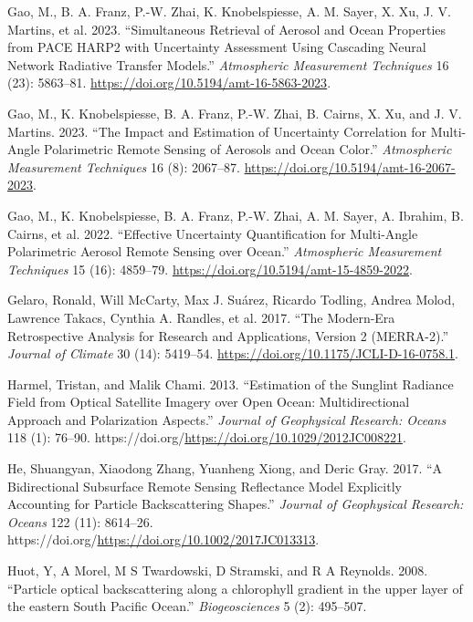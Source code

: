 \documentclass[
  letterpaper,
  open=any]{scrbook}
\newlength{\cslhangindent}
\newenvironment{CSLReferences}[2] %
 {\begin{list}{}{%
  \setlength{\itemindent}{0pt}
  \setlength{\leftmargin}{0pt}
  \setlength{\parsep}{0pt}
  \ifodd #1
   \setlength{\leftmargin}{\cslhangindent}
   \setlength{\itemindent}{-1\cslhangindent}
  \fi
  \setlength{\itemsep}{#2\baselineskip}}}
 {\end{list}}
\begin{document}
\begin{CSLReferences}{1}{0}
Gao, M., B. A. Franz, P.-W. Zhai, K. Knobelspiesse, A. M. Sayer, X. Xu,
J. V. Martins, et al. 2023. {``Simultaneous Retrieval of Aerosol and
Ocean Properties from PACE HARP2 with Uncertainty Assessment Using
Cascading Neural Network Radiative Transfer Models.''} \emph{Atmospheric
Measurement Techniques} 16 (23): 5863--81.
\url{https://doi.org/10.5194/amt-16-5863-2023}.

Gao, M., K. Knobelspiesse, B. A. Franz, P.-W. Zhai, B. Cairns, X. Xu,
and J. V. Martins. 2023. {``The Impact and Estimation of Uncertainty
Correlation for Multi-Angle Polarimetric Remote Sensing of Aerosols and
Ocean Color.''} \emph{Atmospheric Measurement Techniques} 16 (8):
2067--87. \url{https://doi.org/10.5194/amt-16-2067-2023}.

Gao, M., K. Knobelspiesse, B. A. Franz, P.-W. Zhai, A. M. Sayer, A.
Ibrahim, B. Cairns, et al. 2022. {``Effective Uncertainty Quantification
for Multi-Angle Polarimetric Aerosol Remote Sensing over Ocean.''}
\emph{Atmospheric Measurement Techniques} 15 (16): 4859--79.
\url{https://doi.org/10.5194/amt-15-4859-2022}.

Gelaro, Ronald, Will McCarty, Max J. Suárez, Ricardo Todling, Andrea
Molod, Lawrence Takacs, Cynthia A. Randles, et al. 2017. {``The
Modern-Era Retrospective Analysis for Research and Applications, Version
2 (MERRA-2).''} \emph{Journal of Climate} 30 (14): 5419--54.
\url{https://doi.org/10.1175/JCLI-D-16-0758.1}.

Harmel, Tristan, and Malik Chami. 2013. {``Estimation of the Sunglint
Radiance Field from Optical Satellite Imagery over Open Ocean:
Multidirectional Approach and Polarization Aspects.''} \emph{Journal of
Geophysical Research: Oceans} 118 (1): 76--90.
https://doi.org/\url{https://doi.org/10.1029/2012JC008221}.

He, Shuangyan, Xiaodong Zhang, Yuanheng Xiong, and Deric Gray. 2017.
{``A Bidirectional Subsurface Remote Sensing Reflectance Model
Explicitly Accounting for Particle Backscattering Shapes.''}
\emph{Journal of Geophysical Research: Oceans} 122 (11): 8614--26.
https://doi.org/\url{https://doi.org/10.1002/2017JC013313}.

Huot, Y, A Morel, M S Twardowski, D Stramski, and R A Reynolds. 2008.
{``{Particle optical backscattering along a chlorophyll gradient in the
upper layer of the eastern South Pacific Ocean}.''}
\emph{Biogeosciences} 5 (2): 495--507.


\end{CSLReferences}
\end{document}
